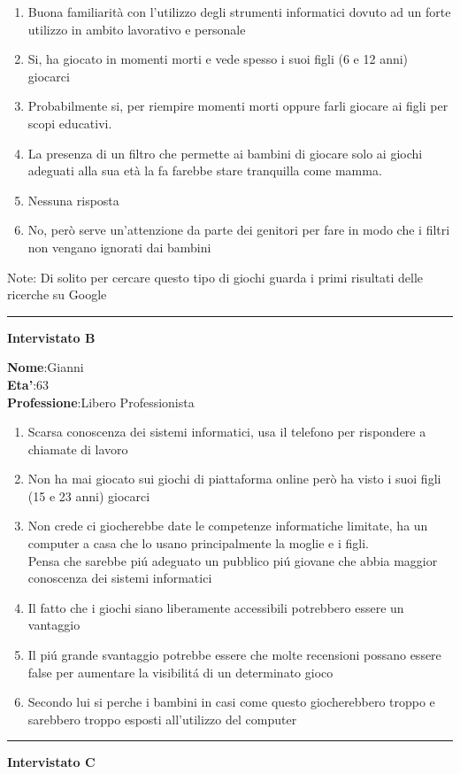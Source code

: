 \documentclass[../Report.tex]{subfiles}
\begin{document}
    \begin{enumerate}
        \item Buona familiarità con l’utilizzo degli strumenti informatici dovuto ad un forte utilizzo in ambito lavorativo e personale
        \item Si, ha giocato in momenti morti e vede spesso i suoi figli (6 e 12 anni) giocarci 
        \item Probabilmente si, per riempire momenti morti oppure farli giocare ai figli per scopi educativi.
        \item La presenza di un filtro che permette ai bambini di giocare solo ai giochi adeguati alla sua età la fa farebbe stare tranquilla come mamma.
        \item Nessuna risposta
        \item No, però serve un’attenzione da parte dei genitori per fare in modo che i filtri non vengano ignorati dai bambini
    \end{enumerate}

    Note: Di solito per cercare questo tipo di giochi guarda i primi risultati delle ricerche su Google\\

    \hrule
    \textbf{Intervistato B}

    \textbf{Nome}:Gianni\\
    \textbf{Eta'}:63\\
    \textbf{Professione}:Libero Professionista\\
    
    \begin{enumerate}
        \item Scarsa conoscenza dei sistemi informatici, usa il telefono per rispondere a chiamate di lavoro
        \item Non ha mai giocato sui giochi di piattaforma online però ha visto i suoi figli (15 e 23 anni) giocarci
        \item Non crede ci giocherebbe date le competenze informatiche limitate, ha un computer a casa che lo usano principalmente la moglie e i figli. \\Pensa che sarebbe piú adeguato un pubblico piú giovane che abbia maggior conoscenza dei sistemi informatici
        \item Il fatto che i giochi siano liberamente accessibili potrebbero essere un vantaggio
        \item Il piú grande svantaggio potrebbe essere che molte recensioni possano essere false per aumentare la visibilitá di un determinato gioco
        \item Secondo lui si perche i bambini in casi come questo giocherebbero troppo e sarebbero troppo esposti all'utilizzo del computer
        
    \end{enumerate}
    \hrule
    \textbf{Intervistato C}\\
    
\end{document}
